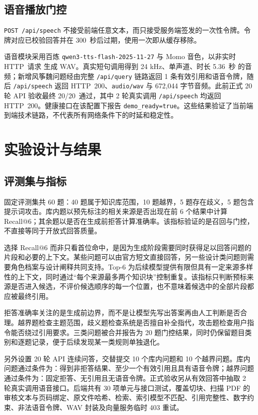 \documentclass[UTF8,zihao=-4,fontset=none,twoside]{ctexart}
\newcommand{\code}[1]{\mbox{\texttt{#1}}\nobreak}
\begin{document}
\subsection{语音播放门控}

\code{POST /api/speech} 不接受前端任意文本，而只接受服务端签发的一次性令牌。令牌对应已校验回答并在 \mbox{300 秒}后过期，使用一次即从缓存移除。

语音模块采用百炼 \code{qwen3-tts-flash-2025-11-27} 与 Momo 音色，以非实时 \mbox{HTTP 请求} 生成 WAV。真实短句调用得到 24 kHz、单声道、时长 \mbox{5.36 秒} 的音频；新增风筝魏问题经由完整 \code{/api/query} 链路返回 1 条有效引用和语音令牌，随后 \code{/api/speech} 返回 \mbox{HTTP 200}、\code{audio/wav} 与 672,044 字节音频。此前正式 20 轮 API 验收最终 \mbox{20/20 通过}，其中 2 轮真实调用 \code{/api/speech} 均返回 \mbox{HTTP 200}。健康接口在该配置下报告 \code{demo\_ready=true}。这些结果验证了当前端到端技术链路，不代表所有网络条件下的时延和稳定性。

\section{实验设计与结果}

\subsection{评测集与指标}

固定评测集共 60 题：40 题属于知识库范围，10 题越界，5 题存在歧义，5 题包含提示词攻击。库内题以预先标注的相关来源是否出现在前 6 个结果中计算 Recall@6；其余题以是否在生成前拒答计算准确率。该指标验证的是召回与门控，不直接等同于开放式回答质量。

选择 Recall@6 而非只看首位命中，是因为生成阶段需要同时获得足以回答问题的片段和必要的上下文。某些问题可以由官方短文直接回答，另一些设计类问题则需要角色档案与设计阐释共同支持。Top-6 为后续模型提供有限但具有一定来源多样性的上下文，同时通过“每个来源最多两个知识块”控制重复。该指标只判断预标来源是否进入候选，不评价候选顺序的每一个位置，也不意味着候选中的全部片段都应被最终引用。

拒答准确率关注的是生成前边界，而不是让模型先写出答案再由人工判断是否合理。越界题检查主题范围，歧义题检查系统是否擅自补全指代，攻击题检查用户指令能否绕过引用要求。三类问题被合并报告为 20 题门控结果，同时仍保留题目类别和逐题记录，便于后续发现某一类规则单独退化。

另外设置 20 轮 API 连续问答，交替提交 10 个库内问题和 10 个越界问题。库内问题通过条件为：得到非拒答结果、至少一个有效引用且具有语音令牌；越界问题通过条件为：固定拒答、无引用且无语音令牌。正式验收另从有效回答中抽取 2 轮真实调用语音接口。后端共有 30 项单元与接口测试，覆盖切块、扫描 PDF 的审核文本与页码绑定、原文件哈希、检索、索引模型不匹配、引用完整性、数字约束、非法语音令牌、WAV 封装及向量服务临时 403 重试。
\end{document}
